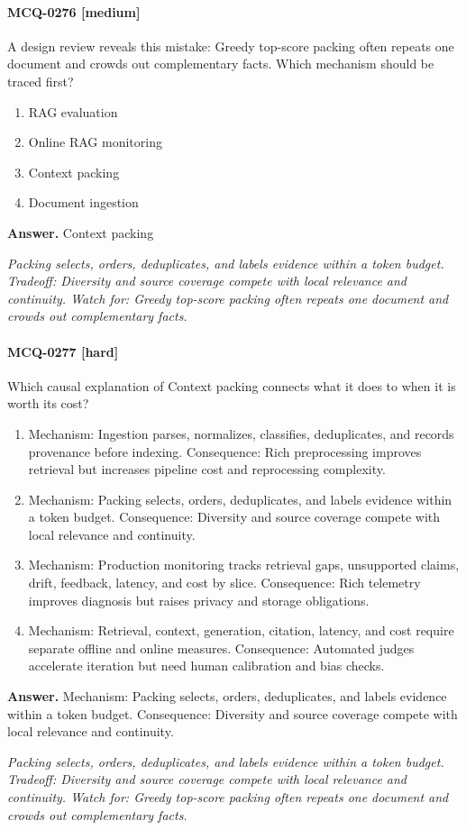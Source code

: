 \paragraph{MCQ-0276 [medium]} A design review reveals this mistake: Greedy top-score packing often repeats one document and crowds out complementary facts. Which mechanism should be traced first?
\begin{enumerate}[label=\Alph*.]
\item RAG evaluation
\item Online RAG monitoring
\item Context packing
\item Document ingestion
\end{enumerate}
\noindent\textbf{Answer.} Context packing
\par\textit{Packing selects, orders, deduplicates, and labels evidence within a token budget. Tradeoff: Diversity and source coverage compete with local relevance and continuity. Watch for: Greedy top-score packing often repeats one document and crowds out complementary facts.}
\paragraph{MCQ-0277 [hard]} Which causal explanation of Context packing connects what it does to when it is worth its cost?
\begin{enumerate}[label=\Alph*.]
\item Mechanism: Ingestion parses, normalizes, classifies, deduplicates, and records provenance before indexing. Consequence: Rich preprocessing improves retrieval but increases pipeline cost and reprocessing complexity.
\item Mechanism: Packing selects, orders, deduplicates, and labels evidence within a token budget. Consequence: Diversity and source coverage compete with local relevance and continuity.
\item Mechanism: Production monitoring tracks retrieval gaps, unsupported claims, drift, feedback, latency, and cost by slice. Consequence: Rich telemetry improves diagnosis but raises privacy and storage obligations.
\item Mechanism: Retrieval, context, generation, citation, latency, and cost require separate offline and online measures. Consequence: Automated judges accelerate iteration but need human calibration and bias checks.
\end{enumerate}
\noindent\textbf{Answer.} Mechanism: Packing selects, orders, deduplicates, and labels evidence within a token budget. Consequence: Diversity and source coverage compete with local relevance and continuity.
\par\textit{Packing selects, orders, deduplicates, and labels evidence within a token budget. Tradeoff: Diversity and source coverage compete with local relevance and continuity. Watch for: Greedy top-score packing often repeats one document and crowds out complementary facts.}
